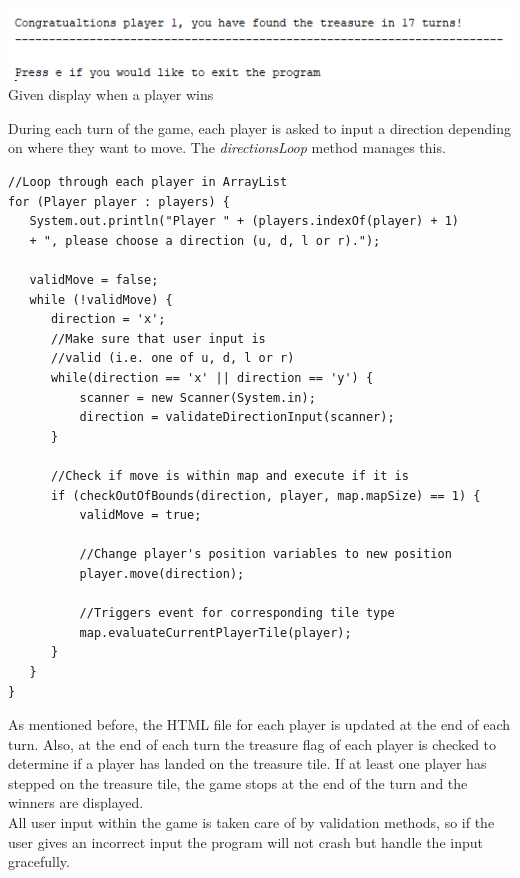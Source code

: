 \documentclass[a4paper,12pt]{extarticle}
\begin{document}
\begin{center}
\includegraphics[scale=1]{BasicMap3.png}
\hspace{1mm}
Given display when a player wins
\end{center}

\noindent During each turn of the game, each player is asked to input a direction depending on where they want to move. The \textit{directionsLoop} method manages this.\\

\begin{lstlisting}
//Loop through each player in ArrayList
for (Player player : players) {
   System.out.println("Player " + (players.indexOf(player) + 1) 
   + ", please choose a direction (u, d, l or r).");

   validMove = false;
   while (!validMove) {
      direction = 'x';
      //Make sure that user input is
      //valid (i.e. one of u, d, l or r)
      while(direction == 'x' || direction == 'y') {
          scanner = new Scanner(System.in);
          direction = validateDirectionInput(scanner);
      }

      //Check if move is within map and execute if it is
      if (checkOutOfBounds(direction, player, map.mapSize) == 1) {
          validMove = true;

          //Change player's position variables to new position
          player.move(direction);

          //Triggers event for corresponding tile type
          map.evaluateCurrentPlayerTile(player);
      }
   }
}

\end{lstlisting}
\vspace{4mm}

\newpage
\noindent As mentioned before, the HTML file for each player is updated at the end of each turn. Also, at the end of each turn the treasure flag of each player is checked to determine if a player has landed on the treasure tile. If at least one player has stepped on the treasure tile, the game stops at the end of the turn and the winners are displayed.\\

\noindent All user input within the game is taken care of by validation methods, so if the user gives an incorrect input the program will not crash but handle the input gracefully.\\
\end{document}
